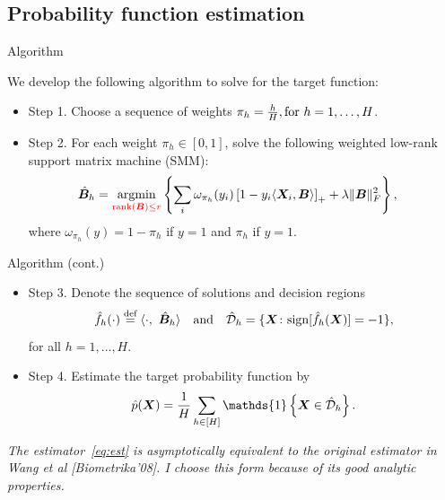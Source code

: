 \documentclass[compress,dvipsnames]{beamer}
\let\olditem\item
\renewcommand\item{\olditem\justifying}
\begin{document}
\subsection{Probability function estimation}
\begin{frame}{Algorithm}

We develop the following algorithm to solve for the target function: 
\begin{itemize}
\item Step 1. Choose a sequence of weights $\pi_h = {h\over H}, \text{for }h=1,\ldots,H$.
\item Step 2. For each weight $\pi_h\in[0,1]$, solve the following {\color{red}weighted low-rank support matrix machine (SMM)}:
\begin{align}\label{eq:sequence}
\hat {\bm{B}}_h&=\operatorname*{argmin}_{{\color{red}\text{rank}(\bm{B})\leq r}} \left\{\sum_{i}\omega_{\pi_h}(y_i)\left[1-y_i\langle \bm{X}_i,\bm{B} \rangle\right]_++\lambda\lVert\bm{B}\rVert_F^2\right\},
\end{align}
\vspace{-2cm}
where $\omega_{\pi_h}(y) = 1-\pi_h$ if $y = 1$ and $\pi_h$ if $y =1$.
\end{itemize}
\end{frame}

\begin{frame}{Algorithm (cont.)}
\begin{itemize}
\item Step 3. Denote the sequence of solutions and decision regions
\[
\hat f_h (\cdot)\stackrel{\text{def}}{=}\langle \cdot,\ \hat {\bm{B}}_h \rangle \quad \text{and}\quad \hat {{\mathcal D}}_h=\{\bm{X}\colon\text{sign}[\hat f_h(\bm{X})] = -1 \},
\]
for all $h=1,\ldots,H$.
\item Step 4. Estimate the target probability function by
\begin{align}\label{eq:est}
\hat p(\mX)={1\over H} \sum_{h\in[H]} \mathds{1}\left\{\mX\in \hat \tD_h \right\}.
\end{align}

\end{itemize}
{\scriptsize \it The estimator~\eqref{eq:est} is asymptotically equivalent to the original estimator in Wang et al [Biometrika'08]. I choose this form because of its good analytic properties.}

\end{frame}
\end{document}
